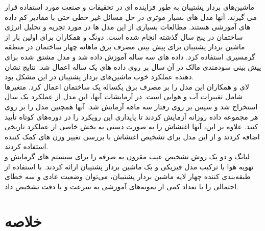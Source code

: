 ماشین‌های بردار پشتیبان به طور فزاینده ای در تحقیقات و صنعت مورد استفاده قرار می گیرند. آنها مدل های بسیار موثری در حل مسائل غیر خطی حتی با مقادیر کم داده های آموزشی هستند. مطالعات بسیاری از این مدل ها در مورد تجزیه و تحلیل انرژی ساختمان در پنج سال گذشته انجام شده است.
دونگ و همکاران \cite{dong2005applying} برای اولین بار از ماشین بردار پشتیبان برای پیش بینی مصرف برق ماهانه چهار ساختمان در منطقه گرمسیری استفاده کرد. داده های سه ساله آموزش داده شد و مدل مشتق شده برای پیش بینی سودمندی مالک در آن سال بر روی داده های یک ساله اعمال شد. نتایج نشان دهنده عملکرد خوب ماشین‌های بردار پشتیبان در این مشکل بود.
\\
لای و همکاران\cite{lai2008vapnik} این مدل را بر مصرف برق یکساله یک ساختمان اعمال کرد. متغیرها شامل تغییرات آب و هوایی است. در آزمایشات آنها، این مدل از عملکرد یک سال استخراج شد و سپس بر روی رفتار سه ماهه آزمایش شد. آنها همچنین مدل را بر روی هر مجموعه داده روزانه آزمایش کردند تا پایداری این رویکرد را در دوره‌های کوتاه تأیید کنند. علاوه بر این، آنها اغتشاش را به صورت دستی به بخش خاصی از عملکرد تاریخی اضافه کردند و از این مدل برای تشخیص اغتشاش با بررسی تغییر وزن های کمک کننده استفاده کردند.
\\
لیانگ و دو \cite{liang2007model} یک روش تشخیص عیب مقرون به صرفه را برای سیستم های گرمایش و تهویه هوا با ترکیب مدل فیزیکی و یک ماشین بردار پشتیبان ارائه کردند. با استفاده از طبقه‌بندی کننده چهار لایه ماشین بردار پشتیبان، می‌توان وضعیت عادی و سه خطای احتمالی را با تعداد کمی از نمونه‌های آموزشی به سرعت و با دقت تشخیص داد.


\section{خلاصه}

